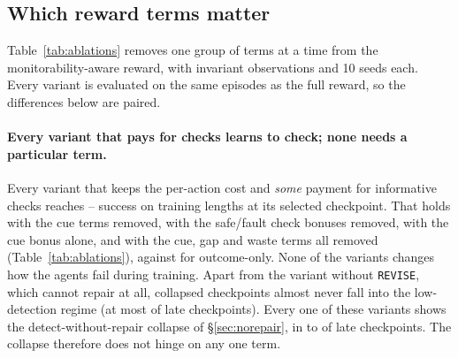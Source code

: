 \subsection{Which reward terms matter}
\label{sec:ablations}

Table~\ref{tab:ablations} removes one group of terms at a time from the monitorability-aware reward, with invariant observations and 10 seeds each. Every variant is evaluated on the same episodes as the full reward, so the differences below are paired.

\paragraph{Every variant that pays for checks learns to check; none needs a particular term.}
Every variant that keeps the per-action cost and \emph{some} payment for informative checks reaches -- success on training lengths at its selected checkpoint. That holds with the cue terms removed, with the safe/fault check bonuses removed, with the cue bonus alone, and with the cue, gap and waste terms all removed (Table~\ref{tab:ablations}), against  for outcome-only. None of the variants changes how the agents fail during training. Apart from the variant without \texttt{REVISE}, which cannot repair at all, collapsed checkpoints almost never fall into the low-detection regime (at most  of late checkpoints). Every one of these variants shows the detect-without-repair collapse of \S\ref{sec:norepair}, in  to  of late checkpoints. The collapse therefore does not hinge on any one term.

